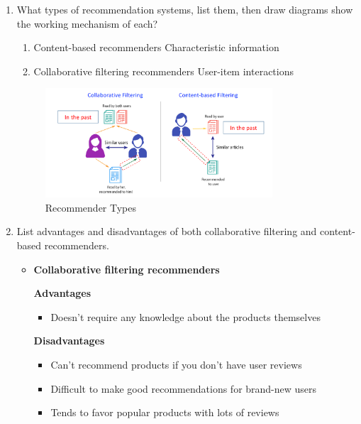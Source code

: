 \documentclass[12pt]{article}
\newenvironment{QandA}{\begin{enumerate}[label=\bfseries\arabic*.]\bfseries}
{\end{enumerate}}
\newenvironment{answered}{\par\normalfont\color{Sepia}}{}
\begin{document}
\begin{QandA}
    \item What types of recommendation systems, list them, then draw
          diagrams show the working mechanism of each?
    \begin{answered}
        \begin{enumerate}
            \item Content-based recommenders \textemdash{} Characteristic information
            \item Collaborative filtering recommenders \textemdash{} User-item interactions
        \end{enumerate}
        \begin{figure}[H]
            \centering
            \includegraphics[width=0.8\textwidth]{recommenders.png}
            \caption{Recommender Types}
            \label{fig:recommenders}
        \end{figure}

    \end{answered}

    \item List advantages and disadvantages of both collaborative
          filtering and content-based recommenders.
    \begin{answered}
        \begin{itemize}
            \item \textbf{Collaborative filtering recommenders}

            \textbf{Advantages}
                \begin{itemize}
                    \item Doesn't require any knowledge about the products themselves
                \end{itemize}

            \textbf{Disadvantages}
                \begin{itemize}
                    \item Can't recommend products if you don't have user reviews
                    \item Difficult to make good recommendations for brand-new users
                    \item Tends to favor popular products with lots of reviews
                \end{itemize}


\end{itemize}
\end{answered}
\end{QandA}
\end{document}
